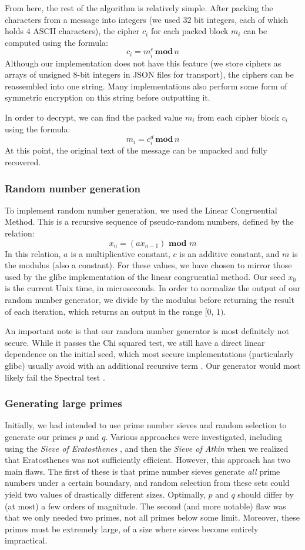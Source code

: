 \documentclass{article}
\begin{document}
From here, the rest of the algorithm is relatively simple. After packing the characters from a message into integers (we used 32 bit integers, each of which holds 4 ASCII characters), the cipher $c_i$ for each packed block $m_i$ can be computed using the formula:
\[ c_i = m_i^e\, \textbf{mod} \, n \]
Although our implementation does not have this feature (we store ciphers as arrays of unsigned 8-bit integers in JSON files for transport), the ciphers can be reassembled into one string. Many implementations also perform some form of symmetric encryption on this string before outputting it.

In order to decrypt, we can find the packed value $m_i$ from each cipher block $c_i$ using the formula:
	\[ m_i = c_i^d \,\textbf{mod}\, n \]
At this point, the original text of the message can be unpacked and fully recovered.

\subsubsection{Random number generation}
To implement random number generation, we used the Linear Congruential Method. This is a recursive sequence of pseudo-random numbers, defined by the relation:
\[ x_n = (ax_{n - 1}) \textbf{ mod } m \]
In this relation, $a$ is a multiplicative constant, $c$ is an additive constant, and $m$ is the modulus (also a constant). For these values, we have chosen to mirror those used by the glibc implementation of the linear congruential method. Our seed $x_0$ is the current Unix time, in microseconds. In order to normalize the output of our random number generator, we divide by the modulus before returning the result of each iteration, which returns an output in the range $[0,\, 1)$.

An important note is that our random number generator is most definitely not secure. While it passes the Chi squared test, we still have a direct linear dependence on the initial seed, which most secure implementations (particularly glibc) usually avoid with an additional recursive term \cite{lcm}. Our generator would most likely fail the Spectral test \cite{spectral}.

\subsubsection{Generating large primes}
Initially, we had intended to use prime number sieves and random selection to generate our primes $p$ and $q$. Various approaches were investigated, including using the \textit{Sieve of Eratosthenes} \cite{sieveeratosthenes}, and then the \textit{Sieve of Atkin} \cite{sieveatkin} when we realized that Eratosthenes was not sufficiently efficient. However, this approach has two main flaws. The first of these is that prime number sieves generate \textit{all} prime numbers under a certain boundary, and random selection from these sets could yield two values of drastically different sizes. Optimally, $p$ and $q$ should differ by (at most) a few orders of magnitude. The second (and more notable) flaw was that we only needed two primes, not all primes below some limit. Moreover, these primes must be extremely large, of a size where sieves become entirely impractical.
\end{document}
